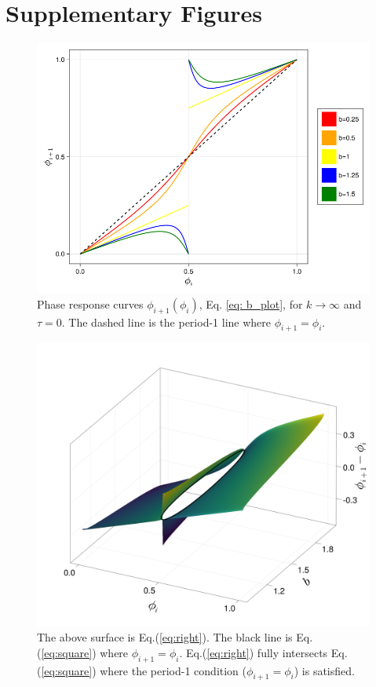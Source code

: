\section{Supplementary Figures}
\begin{figure}[H]
    \begin{center}
    \includegraphics[width=.7\textwidth]{../plots/b_plot.png}
    \end{center}
\caption{Phase response curves $\phi_{i+1}(\phi_i)$, Eq. \ref{eq: b_plot}, for $k\rightarrow \infty$ and $\tau = 0$. The dashed line is the period-1 line where $\phi_{i+1}=\phi_i$.}
\label{b_plot}
\end{figure}

\begin{figure}[H]
    \begin{center}
    \includegraphics[width=.7\textwidth]{../plots/eqs17_fig.png}
    \end{center}
\caption{The above surface is Eq.(\ref{eq:right}). The black line is Eq.(\ref{eq:square}) where $\phi_{i+1}=\phi_i$. Eq.(\ref{eq:right}) fully intersects Eq.(\ref{eq:square}) where the period-1 condition ($\phi_{i+1}=\phi_i$) is satisfied.}
\label{instabbound}
\end{figure}

